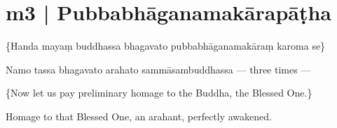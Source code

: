 \section*{m3 | Pubbabhāganamakārapāṭha}\label{sec:m03}

\begin{chantsubsection}
  \chantnote
    {\{Handa mayaṃ buddhassa bhagavato
     pubbabhāganamakāraṃ karoma se\}}

  \chantnote
    {Namo tassa bhagavato arahato sammāsambuddhassa}
  \chantnote
    {--- three times ---}
  \chantgap
  \chantnotetrans
    {\{Now let us pay preliminary homage to the Buddha, the Blessed One.\} \par\;\;\; Homage to that Blessed One, an arahant, perfectly awakened.}
\end{chantsubsection}